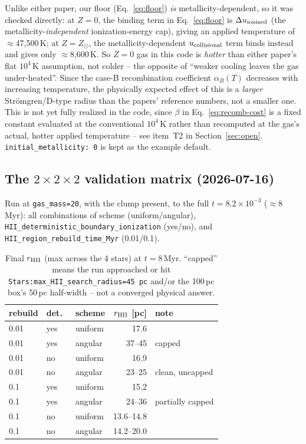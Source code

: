 Unlike either paper, our floor (Eq.~\ref{eq:floor}) \emph{is}
metallicity-dependent, so it was checked directly: at $Z=0$, the
binding term in Eq.~\ref{eq:floor} is $\Delta u_{\rm ionized}$ (the
metallicity-\emph{independent} ionization-energy cap), giving an
applied temperature of $\approx$47,500\,K; at $Z=Z_\odot$, the
metallicity-dependent $u_{\rm collisional}$ term binds instead and
gives only $\approx$8,600\,K. So $Z=0$ gas in this code is
\emph{hotter} than either paper's flat $10^4\,$K assumption, not
colder -- the opposite of ``weaker cooling leaves the gas
under-heated''. Since the case-B recombination coefficient
$\alpha_B(T)$ decreases with increasing temperature, the physically
expected effect of this is a \emph{larger} Str\"omgren/D-type radius
than the papers' reference numbers, not a smaller one. This is not yet
fully realized in the code, since $\beta$ in Eq.~\ref{eq:recomb-cost}
is a fixed constant evaluated at the conventional $10^4\,$K rather
than recomputed at the gas's actual, hotter applied temperature --
see item~T2 in Section~\ref{sec:open}. \texttt{initial\_metallicity: 0}
is kept as the example default.

\subsection{The $2\times2\times2$ validation matrix (2026-07-16)}

Run at \texttt{gas\_mass=20}, with the clump present, to the full
$t=8.2\times10^{-3}$ ($\approx$8\,Myr): all combinations of scheme
(uniform/angular), \texttt{HII\_deterministic\_boundary\_ionization}
(yes/no), and \texttt{HII\_region\_rebuild\_time\_Myr} (0.01/0.1).

\begin{table}
  \centering
  \caption{Final $r_{\rm HII}$ (max across the 4 stars) at $t=8$\,Myr.
    ``capped'' means the run approached or hit
    \texttt{Stars:max\_HII\_search\_radius=45\,pc} and/or the 100\,pc
    box's 50\,pc half-width -- not a converged physical answer.}
  \label{tab:matrix}
  \begin{tabular}{lllr l}
    \hline
    rebuild & det.\ & scheme & $r_{\rm HII}$ [pc] & note \\
    \hline
    0.01 & yes & uniform & 17.6  & \\
    0.01 & yes & angular & 37--45 & capped \\
    0.01 & no  & uniform & 16.9  & \\
    0.01 & no  & angular & 23--25 & clean, uncapped \\
    0.1  & yes & uniform & 15.2  & \\
    0.1  & yes & angular & 24--36 & partially capped \\
    0.1  & no  & uniform & 13.6--14.8 & \\
    0.1  & no  & angular & 14.2--20.0 & \\
    \hline
  \end{tabular}
\end{table}

